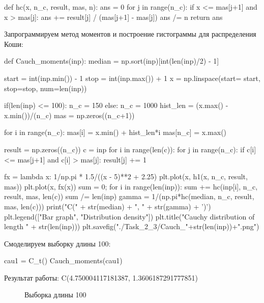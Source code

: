 \documentclass{article}
\begin{document}
\begin{python}
def hc(x, n_c, result, mas, n):
	ans = 0
	for j in range(n_c):
		if x <= mas[j+1] and x > mas[j]:
			ans += result[j] / (mas[j+1] - mas[j])
	ans /= n
	return ans
\end{python}

Запрограммируем метод моментов и построение гистограммы для распределения Коши:
\newpage
\begin{python}
def Cauch_moments(inp):
	median = np.sort(inp)[int(len(inp)/2) - 1]

	start = int(inp.min()) - 1
	stop = int(inp.max()) + 1
	x = np.linspace(start= start, stop=stop, num=len(inp))

	if(len(inp) <= 100):
		n_c = 150
	else:
		n_c = 1000
	hist_len = (x.max() - x.min())/(n_c)
	mas = np.zeros((n_c+1))

	for i in range(n_c):
		mas[i] = x.min() + hist_len*i
	mas[n_c] = x.max()

	result = np.zeros((n_c))
	c = inp
	for i in range(len(c)):
		for j in range(n_c):
			if c[i] <= mas[j+1] and c[i] > mas[j]:
				result[j] += 1

	fx = lambda x: 1/np.pi * 1.5/((x - 5)**2 + 2.25)
	plt.plot(x, h1(x, n_c, result, mas))
	plt.plot(x, fx(x))
	sum = 0;
	for i in range(len(inp)):
		sum += hc(inp[i], n_c, result, mas, len(c))
	sum /= len(inp)
	gamma = 1/(np.pi*hc(median, n_c, result, mas, len(c)))
	print("C(" + str(median) + ", " + str(gamma) + ')')
	plt.legend(["Bar graph", "Distribution density"])
	plt.title("Cauchy distribution of length " + str(len(inp)))
	plt.savefig("./Task_2_3/Cauch_"+str(len(inp))+".png")	
\end{python}

Смоделируем выборку длины 100:
\begin{python}
cau1 = C_t()
Cauch_moments(cau1)
\end{python}
Результат работы:
C(4.750004117181387, 1.3606187291777851)
\begin{figure}[H]
	\caption{Выборка длины 100}
	\label{fig:image}
\end{figure}
\end{document}
